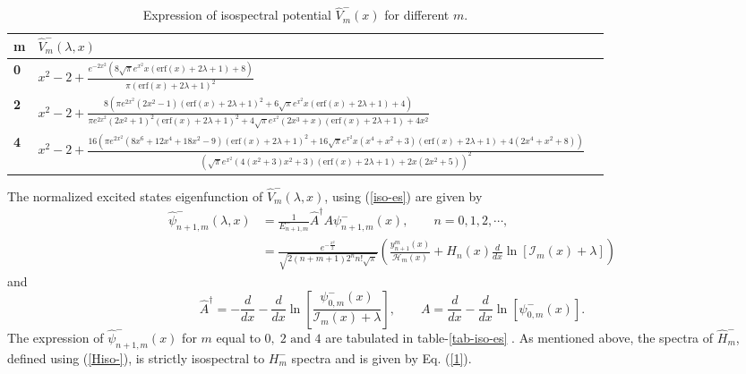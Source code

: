 \documentclass[11pt]{article}
\begin{document}
\begin{table}[htp]
\centering
\setlength{\tabcolsep}{1em}
\begin{tabularx}{\columnwidth}{@{}>{\bfseries}l X l @{}}
\toprule
m &  \( \hat{V}^-_m(\lambda, x) \)\\
\toprule
0& \(x^2-2+ \frac{e^{-2 x^2} \left(8 \sqrt{\pi } e^{x^2} x (\text{erf}(x)+2 \lambda +1)+8\right)}{\pi  (\text{erf}(x)+2 \lambda +1)^2}\)\\
2& \(x^2-2 +\frac{8 \left(\pi  e^{2 x^2} \left(2 x^2-1\right) (\text{erf}(x)+2 \lambda +1)^2+6 \sqrt{\pi } e^{x^2} x (\text{erf}(x)+2 \lambda +1)+4\right)}{\pi  e^{2 x^2} \left(2 x^2+1\right)^2 (\text{erf}(x)+2 \lambda +1)^2+4 \sqrt{\pi } e^{x^2} \left(2 x^3+x\right) (\text{erf}(x)+2 \lambda +1)+4 x^2}\)\\
4& \( x^2-2+\frac{16 \left(\pi  e^{2 x^2} \left(8 x^6+12 x^4+18 x^2-9\right) (\text{erf}(x)+2 \lambda +1)^2+16 \sqrt{\pi } e^{x^2} x \left(x^4+x^2+3\right) (\text{erf}(x)+2 \lambda +1)+4 \left(2 x^4+x^2+8\right)\right)}{\left(\sqrt{\pi } e^{x^2} \left(4 \left(x^2+3\right) x^2+3\right) (\text{erf}(x)+2 \lambda +1)+2 x \left(2 x^2+5\right)\right)^2}\)\\
\bottomrule
\end{tabularx}
\caption{Expression of isospectral potential \(\hat{V}^-_m(x)\) for different \( m \).}
\label{tab-iso-v}
\end{table}
The normalized excited states eigenfunction of \( \hat{V}^-_m(\lambda,x) \), using (\ref{iso-es}) are given by
\begin{align}
\hat{\psi}^-_{n+1,m}(\lambda, x)&=\frac{1}{E^-_{n+1,m}} \hat{A}^{\dagger}A\psi^-_{n+1,m}(x)\label{ISO-ES},\qquad n=0,1,2,\cdots,\\
&=\frac{e^{-\frac{x^2}{2}}}{\sqrt{2(n+m+1)2^nn!\sqrt{\pi}}} \left( \frac{y^m_{n+1}(x)}{\mathcal{H}_m(x)}+    H_n(x)\frac{d}{dx}\ln\left[\mathcal{I}_m(x)+\lambda\right]  \right)\nonumber
\end{align}
and 
\begin{equation*}
\hat{A}^{\dagger}=-\frac{d}{dx}-\frac{d}{dx}\ln\left[\frac{\psi^-_{0,m}(x)}{\mathcal{I}_m(x)+\lambda}\right],\qquad A=\frac{d}{dx}-\frac{d}{dx}\ln [\psi^-_{0,m}(x)].
\end{equation*}
The expression of \(  \hat{\psi}^-_{n+1,m}(x)\) for \( m \) equal to 
\( 0,\;2\text{ and }4 \) are tabulated in table-\ref{tab-iso-es} . As mentioned
above, the spectra of \( \hat{H}^-_m \), defined using (\ref{Hiso-}), is strictly isospectral to \( H^-_m \) spectra and is given by Eq. (\ref{1}). 
\end{document}
